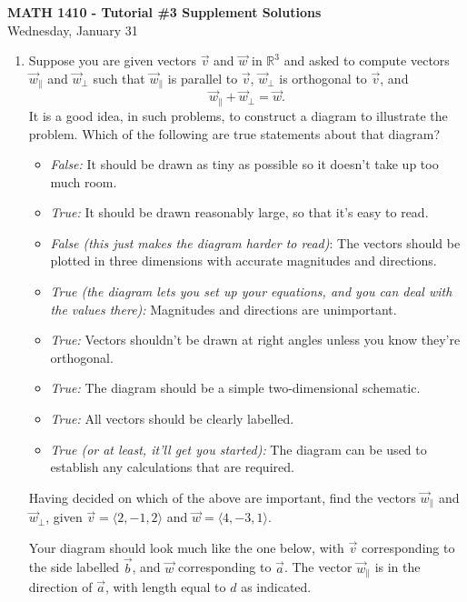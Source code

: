 \documentclass[12pt]{article}
\newcommand{\R}{\mathbb{R}}
\begin{document}
\author{Instructor: Sean Fitzpatrick}
\thispagestyle{empty}
\begin{center}
{\bf MATH 1410 - Tutorial \#3 Supplement Solutions}\\
Wednesday, January 31
\end{center}
\begin{enumerate}
	\item Suppose you are given vectors $\vec{v}$ and $\vec{w}$ in $\R^3$ and asked to compute vectors $\vec{w}_\parallel$ and $\vec{w}_\bot$ such that $\vec{w}_\parallel$ is parallel to $\vec{v}$, $\vec{w}_\bot$ is orthogonal to $\vec{v}$, and 
	\[
	\vec{w}_\parallel+\vec{w}_\bot=\vec{w}.
	\]   
    It is a good idea, in such problems, to construct a diagram to illustrate the problem. Which of the following are true statements about that diagram?
    \begin{itemize}
    \item \textit{False:} It should be drawn as tiny as possible so it doesn't take up too much room.
    \item \textit{True:} It should be drawn reasonably large, so that it's easy to read.
    \item \textit{False (this just makes the diagram harder to read)}: The vectors should be plotted in three dimensions with accurate magnitudes and directions.
    \item \textit{True (the diagram lets you set up your equations, and you can deal with the values there):} Magnitudes and directions are unimportant.
    \item \textit{True:} Vectors shouldn't be drawn at right angles unless you know they're orthogonal.
    \item \textit{True:} The diagram should be a simple two-dimensional schematic.
    \item \textit{True:} All vectors should be clearly labelled.
    \item \textit{True (or at least, it'll get you started):} The diagram can be used to establish any calculations that are required.
    \end{itemize}
    
    \medskip
    
    Having decided on which of the above are important, find the vectors $\vec{w}_\parallel$ and $\vec{w}_\bot$, given $\vec{v}=\langle 2, -1, 2\rangle$ and $\vec{w} = \langle 4,-3,1\rangle$.
    
    Your diagram should look much like the one below, with $\vec{v}$ corresponding to the side labelled $\vec{b}$, and $\vec{w}$ corresponding to $\vec{a}$. The vector $\vec{w}_{\parallel}$ is in the direction of $\vec{a}$, with length equal to $d$ as indicated.
    

\end{enumerate}
\end{document}
